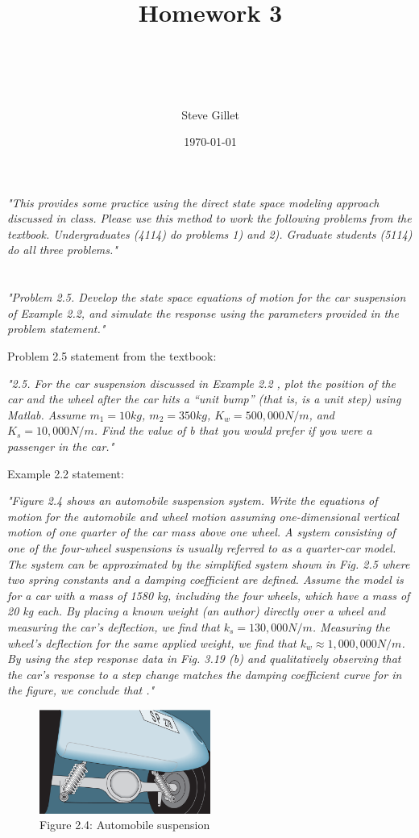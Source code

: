\documentclass{article}
\title{Homework 3 \\ \className \\ \professorName \\ \taName}
\author{Steve Gillet}
\date{\today}
\begin{document}
\maketitle
\textit{
    "This provides some practice using the direct state space modeling approach discussed in class.
    Please use this method to work the following problems from the textbook. Undergraduates
    (4114) do problems 1) and 2). Graduate students (5114) do all three problems."
}

\section{}

\textit{
    "Problem 2.5. Develop the state space equations of motion for the car suspension of
    Example 2.2, and simulate the response using the parameters provided in the problem
    statement."
}

Problem 2.5 statement from the textbook:

\textit{
    "2.5. For the car suspension discussed in Example 2.2 , plot the position of the car and the wheel after the car hits a “unit bump” (that is,  is a unit step) using Matlab. Assume 
    $m_1 = 10 kg$, $m_2 = 350 kg$, $K_w = 500,000 N/m$, and $K_s = 10,000 N/m$.
    Find the value of b that you would prefer if you were a passenger in the car."
}

Example 2.2 statement:

\textit{
    "Figure 2.4 shows an automobile suspension system. Write the equations of motion for the automobile and wheel motion assuming one-dimensional vertical motion of one quarter of the car mass above one wheel. A system consisting of one of the four-wheel suspensions is usually referred to as a quarter-car model. The system can be approximated by the simplified system shown in Fig. 2.5 where two spring constants and a damping coefficient are defined. Assume the model is for a car with a mass of 1580 kg, including the four wheels, which have a mass of 20 kg each. By placing a known weight (an author) directly over a wheel and measuring the car’s deflection, we find that 
    $k_s = 130,000 N/m$. Measuring the wheel’s deflection for the same applied weight, we find that 
    $k_w \approx 1,000,000 N/m$. By using the step response data in Fig. 3.19 (b) and qualitatively observing that the car’s response to a step change matches the damping coefficient curve for  in the figure, we conclude that ."
}

\begin{figure}[H]
    \centering
    \includegraphics[width=0.5\textwidth]{fig24.png}
    \caption*{Figure 2.4: Automobile suspension}
\end{figure}
\end{document}
